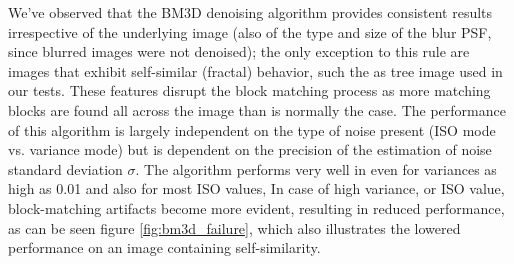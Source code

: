 \documentclass[12pt,notitlepage]{report}
\begin{document}
We've observed that the BM3D denoising algorithm provides consistent results irrespective of the underlying image (also of the type and size of the blur PSF, since blurred images were not denoised); the only exception to this rule are images that exhibit self-similar (fractal) behavior, such the as tree image used in our tests. These features disrupt the block matching process as more matching blocks are found all across the image than is normally the case. The performance of this algorithm is largely independent on the type of noise present (ISO mode vs. variance mode) but is dependent on the precision of the estimation of noise standard deviation $\sigma$. The algorithm performs very well in even for variances as high as 0.01 and also for most ISO values, In case of high variance, or ISO value, block-matching artifacts become more evident, resulting in reduced performance, as can be seen figure \ref{fig:bm3d_failure}, which also illustrates the lowered performance on an image containing self-similarity. 
\end{document}
